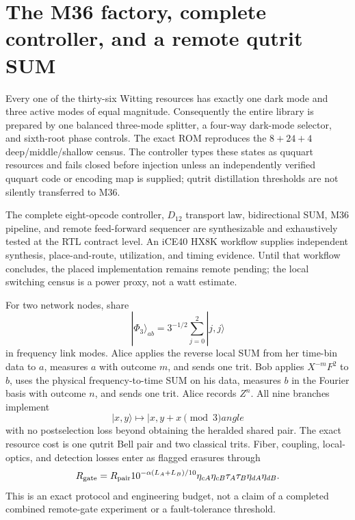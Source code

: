 \section*{The M36 factory, complete controller, and a remote qutrit SUM}
Every one of the thirty-six Witting resources has exactly one dark mode and three active
modes of equal magnitude. Consequently the entire library is prepared by one balanced
three-mode splitter, a four-way dark-mode selector, and sixth-root phase controls. The
exact ROM reproduces the $8+24+4$ deep/middle/shallow census. The controller types these
states as ququart resources and fails closed before injection unless an independently
verified ququart code or encoding map is supplied; qutrit distillation thresholds are not
silently transferred to M36.

The complete eight-opcode controller, $D_{12}$ transport law, bidirectional SUM, M36
pipeline, and remote feed-forward sequencer are synthesizable and exhaustively tested at
the RTL contract level. An iCE40 HX8K workflow supplies independent synthesis,
place-and-route, utilization, and timing evidence. Until that workflow concludes, the
placed implementation remains remote pending; the local switching census is a power proxy,
not a watt estimate.

For two network nodes, share
\[
 |\Phi_3\rangle_{ab}=3^{-1/2}\sum_{j=0}^{2}|j,j\rangle
\]
in frequency link modes. Alice applies the reverse local SUM from her time-bin data to
$a$, measures $a$ with outcome $m$, and sends one trit. Bob applies $X^{-m}F^2$ to $b$,
uses the physical frequency-to-time SUM on his data, measures $b$ in the Fourier basis with
outcome $n$, and sends one trit. Alice records $Z^n$. All nine branches implement
\[
 |x,y\rangle\mapsto|x,y+x\pmod3
angle
\]
with no postselection loss beyond obtaining the heralded shared pair. The exact resource
cost is one qutrit Bell pair and two classical trits. Fiber, coupling, local-optics, and
detection losses enter as flagged erasures through
\[
 R_{\rm gate}=R_{\rm pair}10^{-\alpha(L_A+L_B)/10}
 \eta_{cA}\eta_{cB}\tau_A\tau_B\eta_{dA}\eta_{dB}.
\]
This is an exact protocol and engineering budget, not a claim of a completed combined
remote-gate experiment or a fault-tolerance threshold.
